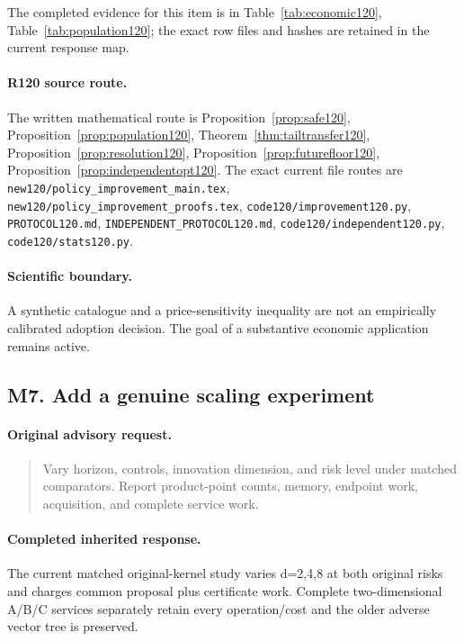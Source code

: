 The completed evidence for this item is in Table~\ref{tab:economic120}, Table~\ref{tab:population120}; the exact row files and hashes are retained in the current response map.
\paragraph{R120 source route.}
The written mathematical route is Proposition~\ref{prop:safe120}, Proposition~\ref{prop:population120}, Theorem~\ref{thm:tailtransfer120}, Proposition~\ref{prop:resolution120}, Proposition~\ref{prop:futurefloor120}, Proposition~\ref{prop:independentopt120}. The exact current file routes are \nolinkurl{new120/policy_improvement_main.tex}, \nolinkurl{new120/policy_improvement_proofs.tex}, \nolinkurl{code120/improvement120.py}, \nolinkurl{PROTOCOL120.md}, \nolinkurl{INDEPENDENT_PROTOCOL120.md}, \nolinkurl{code120/independent120.py}, \nolinkurl{code120/stats120.py}.
\paragraph{Scientific boundary.}
A synthetic catalogue and a price-sensitivity inequality are not an empirically calibrated adoption decision. The goal of a substantive economic application remains active.

\subsection{M7. Add a genuine scaling experiment}
\label{response120:M7}
\paragraph{Original advisory request.}
\begin{quote}
Vary horizon, controls, innovation dimension, and risk level under matched comparators. Report product-point counts, memory, endpoint work, acquisition, and complete service work.
\end{quote}
\paragraph{Completed inherited response.}
The current matched original-kernel study varies d=2,4,8 at both original risks and charges common proposal plus certificate work. Complete two-dimensional A/B/C services separately retain every operation/cost and the older adverse vector tree is preserved.
